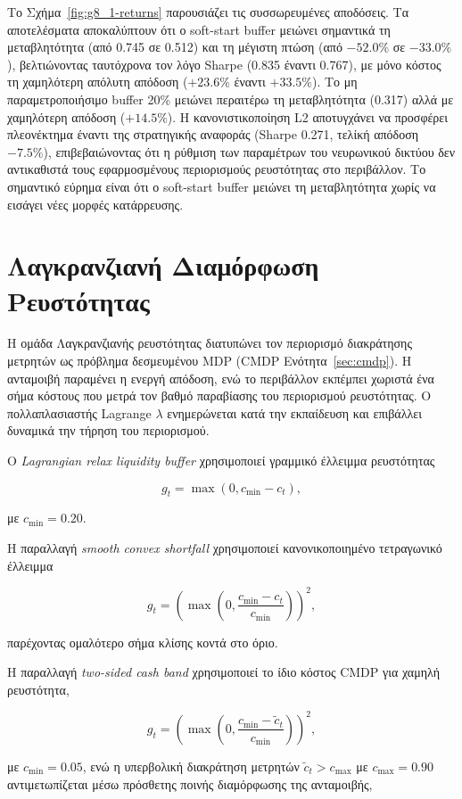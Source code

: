 Το Σχήμα~\ref{fig:g8_1-returns} παρουσιάζει τις συσσωρευμένες αποδόσεις. Τα αποτελέσματα αποκαλύπτουν ότι ο soft-start buffer 
μειώνει σημαντικά τη μεταβλητότητα (από 0.745 σε 0.512) και τη μέγιστη πτώση (από $-52{.}0\%$ σε $-33{.}0\%$), βελτιώνοντας 
ταυτόχρονα τον λόγο Sharpe (0.835 έναντι 0.767), με μόνο κόστος τη χαμηλότερη απόλυτη απόδοση ($+23{.}6\%$ έναντι $+33{.}5\%$). 
Το μη παραμετροποιήσιμο buffer 20\% μειώνει περαιτέρω τη μεταβλητότητα (0.317) αλλά με χαμηλότερη απόδοση ($+14{.}5\%$). 
Η κανονιστικοποίηση L2 αποτυγχάνει να προσφέρει πλεονέκτημα έναντι της στρατηγικής αναφοράς (Sharpe 0.271, τελίκή απόδοση $-7{.}5\%$), 
επιβεβαιώνοντας ότι η ρύθμιση των παραμέτρων του νευρωνικού δικτύου δεν αντικαθιστά τους εφαρμοσμένους περιορισμούς ρευστότητας στο περιβάλλον.
Το σημαντικό εύρημα είναι ότι ο soft-start buffer μειώνει τη μεταβλητότητα χωρίς να εισάγει νέες μορφές κατάρρευσης.

\section{Λαγκρανζιανή Διαμόρφωση Ρευστότητας}
\label{sec:exp-lagrangian}

Η ομάδα Λαγκρανζιανής ρευστότητας διατυπώνει τον περιορισμό διακράτησης
μετρητών ως πρόβλημα δεσμευμένου MDP (CMDP Ενότητα~\ref{sec:cmdp}). Η ανταμοιβή παραμένει η
ενεργή απόδοση, ενώ το περιβάλλον εκπέμπει χωριστά ένα σήμα κόστους
που μετρά τον βαθμό παραβίασης του περιορισμού ρευστότητας.
Ο πολλαπλασιαστής Lagrange $\lambda$ ενημερώνεται κατά την εκπαίδευση
και επιβάλλει δυναμικά την τήρηση του περιορισμού.

Ο \textit{Lagrangian relax liquidity buffer} χρησιμοποιεί γραμμικό
έλλειμμα ρευστότητας

\[
g_t=\max(0,c_{\min}-c_t),
\]

με $c_{\min}=0.20$.

Η παραλλαγή \textit{smooth convex shortfall} χρησιμοποιεί
κανονικοποιημένο τετραγωνικό έλλειμμα

\[
g_t=
\left(
\max\left(
0,\frac{c_{\min}-c_t}{c_{\min}}
\right)
\right)^2,
\]

παρέχοντας ομαλότερο σήμα κλίσης κοντά στο όριο.

Η παραλλαγή \textit{two-sided cash band} χρησιμοποιεί το ίδιο κόστος
CMDP για χαμηλή ρευστότητα,

\[
g_t=
\left(
\max\left(
0,\frac{c_{\min}-\tilde c_t}{c_{\min}}
\right)
\right)^2,
\]

με $c_{\min}=0.05$, ενώ η υπερβολική διακράτηση μετρητών
$\tilde c_t>c_{\max}$ με $c_{\max}=0.90$ αντιμετωπίζεται μέσω
πρόσθετης ποινής διαμόρφωσης της ανταμοιβής,

